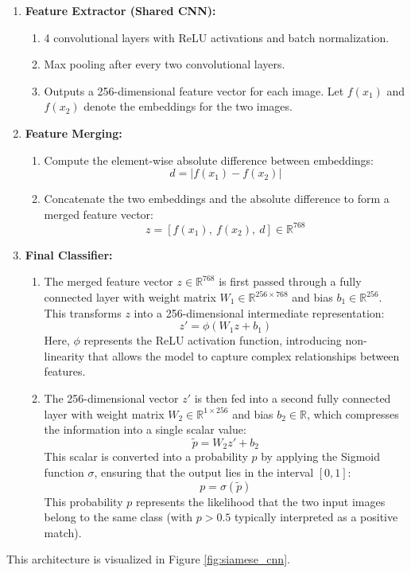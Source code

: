\documentclass{article}
\begin{document}
\begin{enumerate}
  \item \textbf{Feature Extractor (Shared CNN):}
  \begin{enumerate}
    \item 4 convolutional layers with ReLU activations and batch normalization.
    \item Max pooling after every two convolutional layers.
    \item Outputs a 256-dimensional feature vector for each image. Let \( f(x_1) \) and \( f(x_2) \) denote the embeddings for the two images.
  \end{enumerate}
  \item \textbf{Feature Merging:}
  \begin{enumerate}
    \item Compute the element-wise absolute difference between embeddings:
    \[
    d = \left| f(x_1) - f(x_2) \right|
    \]
    \item Concatenate the two embeddings and the absolute difference to form a merged feature vector:
    \[
    z = \left[ f(x_1),\ f(x_2),\ d \right] \in \mathbb{R}^{768}
    \]
  \end{enumerate}
  \item \textbf{Final Classifier:}
  \begin{enumerate}
    \item The merged feature vector \(z \in \mathbb{R}^{768}\) is first passed through a fully connected layer with weight matrix \(W_1 \in \mathbb{R}^{256 \times 768}\) and bias \(b_1 \in \mathbb{R}^{256}\). This transforms \(z\) into a 256-dimensional intermediate representation:
    \[
    z' = \phi(W_1 z + b_1)
    \]
    Here, \(\phi\) represents the ReLU activation function, introducing non-linearity that allows the model to capture complex relationships between features.
    
    \item The 256-dimensional vector \(z'\) is then fed into a second fully connected layer with weight matrix \(W_2 \in \mathbb{R}^{1 \times 256}\) and bias \(b_2 \in \mathbb{R}\), which compresses the information into a single scalar value:
    \[
    \tilde{p} = W_2 z' + b_2
    \]
    This scalar is converted into a probability \(p\) by applying the Sigmoid function \(\sigma\), ensuring that the output lies in the interval \([0,1]\):
    \[
    p = \sigma(\tilde{p})
    \]
    This probability \(p\) represents the likelihood that the two input images belong to the same class (with \(p > 0.5\) typically interpreted as a positive match).
  \end{enumerate}
\end{enumerate}
This architecture is visualized in Figure \ref{fig:siamese_cnn}.
\end{document}
